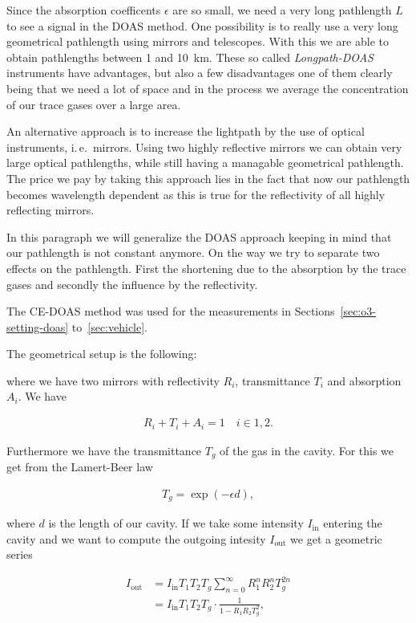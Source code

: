 Since the absorption coefficents $\epsilon$ are so small, we need a
very long pathlength $L$ to see a signal in the DOAS method. One
possibility is to really use a very long geometrical pathlength using
mirrors and telescopes. With this we are able to obtain pathlengths
between \num{1} and \SI{10}{\kilo\meter}. These so called
\emph{Longpath-DOAS} instruments have advantages, but also a few
disadvantages one of them clearly being that we need a lot of space
and in the process we average the concentration of our trace gases
over a large area.

An alternative approach is to increase the lightpath by the use of
optical instruments, i.\,e.\ mirrors. Using two highly reflective
mirrors we can obtain very large optical pathlengths, while still
having a managable geometrical pathlength. The price we pay by taking
this approach lies in the fact that now our pathlength becomes
wavelength dependent as this is true for the reflectivity of all
highly reflecting mirrors. 

In this paragraph we will generalize the DOAS approach keeping in mind
that our pathlength is not constant anymore. On the way we try to
separate two effects on the pathlength. First the shortening due to
the absorption by the trace gases and secondly the influence by the
reflectivity.

The CE-DOAS method was used for the measurements in
Sections~\ref{sec:o3-setting-doas} to~\ref{sec:vehicle}. 

The geometrical setup is the following:

where we have two mirrors with reflectivity $R_i$, transmittance $T_i$
and absorption $A_i$. We have

\begin{align*}
  R_i + T_i + A_i = 1 \quad i \in{1,2}.
\end{align*}

Furthermore we have the transmittance $T_g$ of the gas in the
cavity. For this we get from the Lamert-Beer law

\begin{align*}
  T_g = \exp(-\epsilon d),
\end{align*}

where $d$ is the length of our cavity. If we take some intensity
$I_{\text{in}}$ entering the cavity and we want to compute the outgoing
intesity $I_{\text{out}}$ we get a geometric series

\begin{align*}
  I_{\text{out}} & = I_{\text{in}} T_1 T_2 T_g \sum_{n=0}^\infty R_1^n R_2^n T_g^{2n}\\
  & = I_{\text{in}} T_1 T_2 T_g \cdot \frac{1}{1 - R_1R_2T_g^2},
\end{align*}

